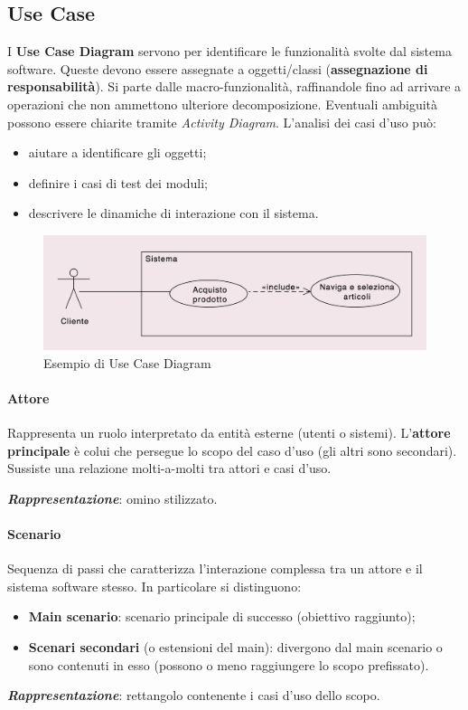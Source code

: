 \subsection{Use Case}

I \textbf{Use Case Diagram} servono per identificare le funzionalità svolte dal sistema software. Queste devono essere assegnate a oggetti/classi (\textbf{assegnazione di responsabilità}). Si parte dalle macro-funzionalità, raffinandole fino ad arrivare a operazioni che non ammettono ulteriore decomposizione. Eventuali ambiguità possono essere chiarite tramite \textit{Activity Diagram}. L'analisi dei casi d'uso può:
\begin{itemize}
    \item aiutare a identificare gli oggetti;
    \item definire i casi di test dei moduli;
    \item descrivere le dinamiche di interazione con il sistema.
\end{itemize}

\begin{figure}[H]
    \centering
    \includegraphics[width=0.75\linewidth]{assets/UML/use-case/use-case1.png}
    \caption{Esempio di Use Case Diagram}
    \label{fig:use-case1}
\end{figure}

\paragraph{Attore} Rappresenta un ruolo interpretato da entità esterne (utenti o sistemi). L'\textbf{attore principale} è colui che persegue lo scopo del caso d'uso (gli altri sono secondari). Sussiste una relazione molti-a-molti tra attori e casi d'uso.

\textbf{\textit{Rappresentazione}}: omino stilizzato.

\paragraph{Scenario} Sequenza di passi che caratterizza l'interazione complessa tra un attore e il sistema software stesso. In particolare si distinguono:
\begin{itemize}
    \item \textbf{Main scenario}: scenario principale di successo (obiettivo raggiunto);
    \item \textbf{Scenari secondari} (o estensioni del main): divergono dal main scenario o sono contenuti in esso (possono o meno raggiungere lo scopo prefissato).
\end{itemize}
\textbf{\textit{Rappresentazione}}: rettangolo contenente i casi d'uso dello scopo.

